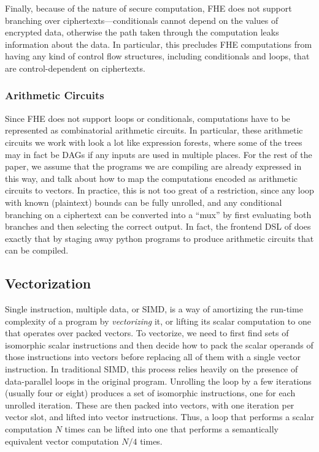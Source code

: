 Finally, because of the nature of secure computation, FHE does not support branching over ciphertexts---conditionals cannot depend on the values of encrypted data, otherwise the path taken through the computation leaks information about the data. 
In particular, this precludes FHE computations from having any kind of control flow structures, including conditionals and loops, that are control-dependent on ciphertexts.

\subsubsection{Arithmetic Circuits}%
Since FHE does not support loops or conditionals, computations have to be represented as combinatorial arithmetic circuits.
In particular, these arithmetic circuits we work with look a lot like expression forests, where some of the trees may in fact be DAGs if any inputs are used in multiple places.
For the rest of the paper, we assume that the programs we are compiling are already expressed in this way, and talk about how to map the computations encoded as arithmetic circuits to vectors.
In practice, this is not too great of a restriction, since any loop with known (plaintext) bounds can be fully unrolled, and any conditional branching on a ciphertext can be converted into a ``mux'' by first evaluating both branches and then selecting the correct output.
In fact, the frontend DSL of \system does exactly that by staging away python programs to produce arithmetic circuits that can be compiled.

\subsection{Vectorization}
Single instruction, multiple data, or SIMD, is a way of amortizing the run-time complexity of a program by {\em vectorizing} it, or lifting its scalar computation to one that operates over packed vectors.
To vectorize, we need to first find sets of isomorphic scalar instructions and then decide how to pack the scalar operands of those instructions into vectors before replacing all of them with a single vector instruction.
In traditional SIMD, this process relies heavily on the presence of data-parallel loops in the original program.
Unrolling the loop by a few iterations (usually four or eight) produces a set of isomorphic instructions, one for each unrolled iteration.
These are then packed into vectors, with one iteration per vector slot, and lifted into vector instructions.
Thus, a loop that performs a scalar computation $N$ times can be lifted into one that performs a semantically equivalent vector computation $N/4$ times.


